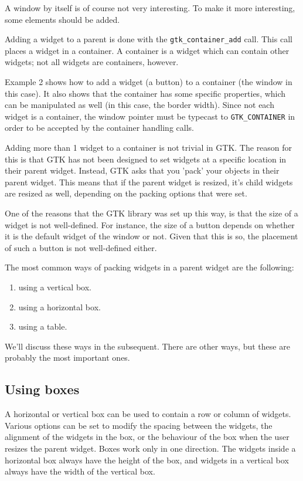\documentclass[10pt]{article}
\begin{document}
A window by itself is of course not very interesting. To make it more
interesting, some elements should be added. 

Adding a widget to a parent is done with the \lstinline|gtk_container_add|
call. This call places a widget in a container. A container is a widget 
which can contain other widgets; not all widgets are containers, however.

Example 2 shows how to add a widget (a button) to a container (the window
in this case). It also shows that the container has some specific
properties, which can be manipulated as well (in this case, the border
width). Since not each widget is a container, the window pointer must be
typecast to \lstinline|GTK_CONTAINER| in order to be accepted by the
container handling calls.



Adding more than 1 widget to a container is not trivial in GTK. The reason
for this is that GTK has not been designed to set widgets at a specific
location in their parent widget. Instead, GTK asks that you 'pack' your
objects in their parent widget. This means that if the parent widget is
resized, it's child widgets are resized as well, depending on the packing
options that were set.

One of the reasons that the GTK library was set up this way, is that the
size of a widget is not well-defined. For instance, the size of a button
depends on whether it is the default widget of the window or not. Given 
that this is so, the placement of such a button is not well-defined either.

The most common ways of packing widgets in a parent widget are the
following:
\begin{enumerate}
\item using a vertical box.
\item using a horizontal box.
\item using a table.
\end{enumerate}
We'll discuss these ways in the subsequent. There are other ways, but these
are probably the most important ones.

\subsection{Using boxes}

A horizontal or vertical box can be used to contain a row or column of
widgets. Various options can be set to modify the spacing between the 
widgets, the alignment of the widgets in the box, or the behaviour of 
the box when the user resizes the parent widget. Boxes work only in 
one direction. The widgets inside a horizontal box always have the height of
the box, and widgets in a vertical box always have the width of the vertical
box.
\end{document}
